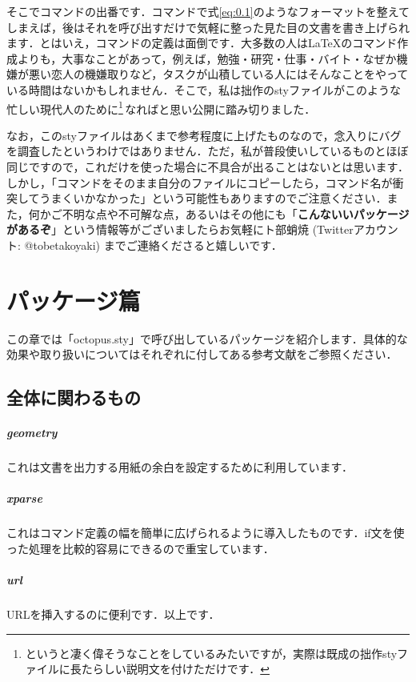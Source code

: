 \documentclass[uplatex]{jsreport}
\begin{document}
そこでコマンドの出番です．コマンドで式\eqref{eq:0.1}のようなフォーマットを整えてしまえば，後はそれを呼び出すだけで気軽に整った見た目の文書を書き上げられます．とはいえ，コマンドの定義は面倒です．大多数の人は{\LaTeX}のコマンド作成よりも，大事なことがあって，例えば，勉強・研究・仕事・バイト・なぜか機嫌が悪い恋人の機嫌取りなど，タスクが山積している人にはそんなことをやっている時間はないかもしれません．そこで，私は拙作のstyファイルがこのような忙しい現代人のために\footnote{というと凄く偉そうなことをしているみたいですが，実際は既成の拙作styファイルに長たらしい説明文を付けただけです．}\,なればと思い公開に踏み切りました．
\par
\sukima
なお，このstyファイルはあくまで参考程度に上げたものなので，念入りにバグを調査したというわけではありません．ただ，私が普段使いしているものとほぼ同じですので，これだけを使った場合に不具合が出ることはないとは思います．しかし，「コマンドをそのまま自分のファイルにコピーしたら，コマンド名が衝突してうまくいかなかった」という可能性もありますのでご注意ください．また，何かご不明な点や不可解な点，あるいはその他にも「\textbf{こんないいパッケージがあるぞ}」という情報等がございましたらお気軽にト部蛸焼 (Twitterアカウント: @tobetakoyaki) までご連絡くださると嬉しいです．
\par
\tableofcontents
\newpage
\chapter{パッケージ篇}
この章では「octopus.sty」で呼び出しているパッケージを紹介します．具体的な効果や取り扱いについてはそれぞれに付してある参考文献をご参照ください．
\section{全体に関わるもの}
\paragraph{geometry} これは文書を出力する用紙の余白を設定するために利用しています\cite{geometry}．
\paragraph{xparse} これはコマンド定義の幅を簡単に広げられるように導入したものです．if文を使った処理を比較的容易にできるので重宝しています\cite{xparse}．
\paragraph{url} URLを挿入するのに便利です．以上です\cite{url}．
\end{document}
